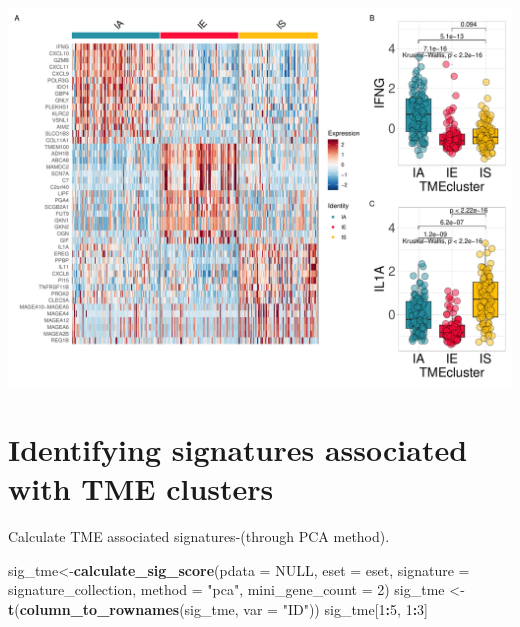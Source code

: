 \documentclass[
  12pt,
]{book}
\newenvironment{Shaded}{\begin{snugshade}}{\end{snugshade}}
\newcommand{\AttributeTok}[1]{\textcolor[rgb]{0.13,0.29,0.53}{#1}}
\newcommand{\ConstantTok}[1]{\textcolor[rgb]{0.56,0.35,0.01}{#1}}
\newcommand{\DecValTok}[1]{\textcolor[rgb]{0.00,0.00,0.81}{#1}}
\newcommand{\FunctionTok}[1]{\textcolor[rgb]{0.13,0.29,0.53}{\textbf{#1}}}
\newcommand{\NormalTok}[1]{#1}
\newcommand{\OtherTok}[1]{\textcolor[rgb]{0.56,0.35,0.01}{#1}}
\newcommand{\SpecialCharTok}[1]{\textcolor[rgb]{0.81,0.36,0.00}{\textbf{#1}}}
\newcommand{\StringTok}[1]{\textcolor[rgb]{0.31,0.60,0.02}{#1}}
\theoremstyle{definition}
\theoremstyle{definition}
\theoremstyle{definition}
\theoremstyle{definition}
\theoremstyle{remark}
\begin{document}
\includegraphics{_main_files/figure-latex/unnamed-chunk-25-1.pdf}

\hypertarget{identifying-signatures-associated-with-tme-clusters}{%
\section{Identifying signatures associated with TME clusters}\label{identifying-signatures-associated-with-tme-clusters}}

Calculate TME associated signatures-(through PCA method).

\begin{Shaded}
\begin{Highlighting}[]
\NormalTok{sig\_tme}\OtherTok{\textless{}{-}}\FunctionTok{calculate\_sig\_score}\NormalTok{(}\AttributeTok{pdata           =} \ConstantTok{NULL}\NormalTok{,}
                             \AttributeTok{eset            =}\NormalTok{ eset,}
                             \AttributeTok{signature       =}\NormalTok{ signature\_collection,}
                             \AttributeTok{method          =} \StringTok{"pca"}\NormalTok{,}
                             \AttributeTok{mini\_gene\_count =} \DecValTok{2}\NormalTok{)}
\NormalTok{sig\_tme }\OtherTok{\textless{}{-}} \FunctionTok{t}\NormalTok{(}\FunctionTok{column\_to\_rownames}\NormalTok{(sig\_tme, }\AttributeTok{var =} \StringTok{"ID"}\NormalTok{))}
\NormalTok{sig\_tme[}\DecValTok{1}\SpecialCharTok{:}\DecValTok{5}\NormalTok{, }\DecValTok{1}\SpecialCharTok{:}\DecValTok{3}\NormalTok{]}
\end{Highlighting}
\end{Shaded}
\end{document}
